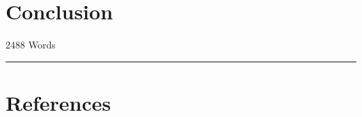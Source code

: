 \documentclass[
  12pt,
]{article}
\begin{document}
\hypertarget{conclusion}{%
\section{Conclusion}\label{conclusion}}

\begin{flushright}
2488 Words
\end{flushright}
\footnotesize

\begin{center}\rule{0.5\linewidth}{0.5pt}\end{center}

\hypertarget{references}{%
\section*{References}\label{references}}
\end{document}
